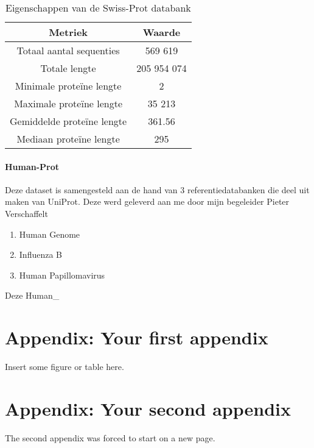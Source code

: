 \documentclass[11pt,dutch,faculty=we,layout=titlefont,underline=false,titleUppercase=true,titleUnderline=true]{ugent2016-report}
\begin{document}
    \begin{table}[h!]
        \centering
        \begin{tabular}{|c|c|}
            \hline
            Metriek & Waarde \\
            \hline\hline
            Totaal aantal sequenties & 569 619 \\ %
            Totale lengte & 205 954 074 \\
            Minimale proteïne lengte & 2 \\
            Maximale proteïne lengte & 35 213 \\
            Gemiddelde proteïne lengte & 361.56 \\
            Mediaan proteïne lengte & 295 \\
            \hline
        \end{tabular}
        \caption{Eigenschappen van de Swiss-Prot databank}
        \label{table:1}
    \end{table}

    \paragraph{Human-Prot} Deze dataset is samengesteld aan de hand van 3 referentiedatabanken die deel uit maken van UniProt.
    Deze werd geleverd aan me door mijn begeleider Pieter Verschaffelt
    \begin{enumerate}
        \item Human Genome~\cite{proteomes_homo_sapiens}
        \item Influenza B~\cite{proteomes_infuenza_b}
        \item Human Papillomavirus~\cite{proteomes_human_papillomavirus}
    \end{enumerate}

    Deze Human_


    \printbibliography[heading=bibintoc,title={Referenties}] %


    \appendix


    \section{Appendix: Your first appendix}
    Insert some figure or table here.

    \newpage


    \section{Appendix: Your second appendix}
    The second appendix was forced to start on a new page.
\end{document}
